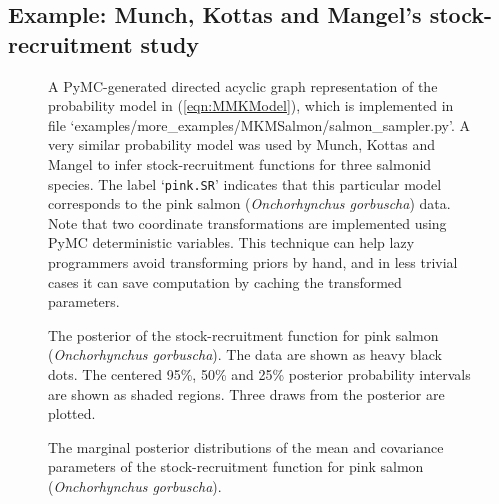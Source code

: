 \documentclass{manual}
\begin{document}
\subsection{Example: Munch, Kottas and Mangel's stock-recruitment study}\label{sub:MMKMCMC}

\begin{figure}
    \centering
    \caption{A PyMC-generated directed acyclic graph representation of the probability model in (\ref{eqn:MMKModel}), which is implemented in file \textsf{`examples/more_examples/MKMSalmon/salmon_sampler.py'}. A very similar probability model was used by Munch, Kottas and Mangel to infer stock-recruitment functions for three salmonid species. The label `\texttt{pink.SR}' indicates that this particular model corresponds to the pink salmon (\emph{Onchorhynchus gorbuscha}) data. Note that two coordinate transformations are implemented using PyMC deterministic variables. This technique can help lazy programmers avoid transforming priors by hand, and in less trivial cases it can save computation by caching the transformed parameters.}
    \label{fig:MMKsalmonmodel}
\end{figure}

\begin{figure}
    \centering
    \caption{The posterior of the stock-recruitment function for pink salmon (\emph{Onchorhynchus gorbuscha}). The data are shown as heavy black dots. The centered 95\%, 50\% and 25\% posterior probability intervals are shown as shaded regions. Three draws from the posterior are plotted.}
    \label{fig:pinkfpost}
\end{figure}

\begin{figure}
    \centering
    \caption{The marginal posterior distributions of the mean and covariance parameters of the stock-recruitment function for pink salmon (\emph{Onchorhynchus gorbuscha}).}
    \label{fig:pinkparams}
\end{figure}
\end{document}

